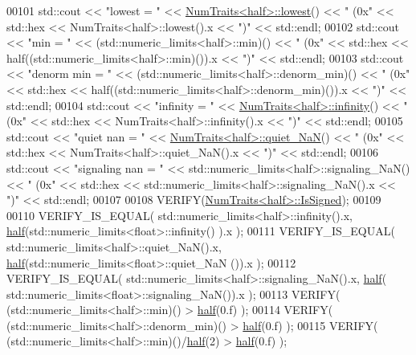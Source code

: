 \begin{DoxyCode}
00101   std::cout << \textcolor{stringliteral}{"lowest        = "} << \hyperlink{group___core___module_struct_eigen_1_1_num_traits}{NumTraits<half>::lowest}() << \textcolor{stringliteral}{"  (0x"} << 
      std::hex << NumTraits<half>::lowest().x << \textcolor{stringliteral}{")"} << std::endl;
00102   std::cout << \textcolor{stringliteral}{"min           = "} << (std::numeric\_limits<half>::min)() << \textcolor{stringliteral}{"  (0x"} << std::hex <<
       half((std::numeric\_limits<half>::min)()).x << \textcolor{stringliteral}{")"} << std::endl;
00103   std::cout << \textcolor{stringliteral}{"denorm min    = "} << (std::numeric\_limits<half>::denorm\_min)() << \textcolor{stringliteral}{"  (0x"} << std::hex <<
       half((std::numeric\_limits<half>::denorm\_min)()).x << \textcolor{stringliteral}{")"} << std::endl;
00104   std::cout << \textcolor{stringliteral}{"infinity      = "} << \hyperlink{group___core___module_struct_eigen_1_1_num_traits}{NumTraits<half>::infinity}() << \textcolor{stringliteral}{"  (0x"} << 
      std::hex << NumTraits<half>::infinity().x << \textcolor{stringliteral}{")"} << std::endl;
00105   std::cout << \textcolor{stringliteral}{"quiet nan     = "} << \hyperlink{group___core___module_struct_eigen_1_1_num_traits}{NumTraits<half>::quiet\_NaN}() << \textcolor{stringliteral}{"  (0x"} << 
      std::hex << NumTraits<half>::quiet\_NaN().x << \textcolor{stringliteral}{")"} << std::endl;
00106   std::cout << \textcolor{stringliteral}{"signaling nan = "} << std::numeric\_limits<half>::signaling\_NaN() << \textcolor{stringliteral}{"  (0x"} << std::hex <<
       std::numeric\_limits<half>::signaling\_NaN().x << \textcolor{stringliteral}{")"} << std::endl;
00107 
00108   VERIFY(\hyperlink{group___core___module_struct_eigen_1_1_num_traits}{NumTraits<half>::IsSigned});
00109 
00110   VERIFY\_IS\_EQUAL( std::numeric\_limits<half>::infinity().x, \hyperlink{struct_eigen_1_1half}{half}(std::numeric\_limits<float>::infinity()
      ).x );
00111   VERIFY\_IS\_EQUAL( std::numeric\_limits<half>::quiet\_NaN().x, \hyperlink{struct_eigen_1_1half}{half}(std::numeric\_limits<float>::quiet\_NaN
      ()).x );
00112   VERIFY\_IS\_EQUAL( std::numeric\_limits<half>::signaling\_NaN().x, \hyperlink{struct_eigen_1_1half}{half}(
      std::numeric\_limits<float>::signaling\_NaN()).x );
00113   VERIFY( (std::numeric\_limits<half>::min)() > \hyperlink{struct_eigen_1_1half}{half}(0.f) );
00114   VERIFY( (std::numeric\_limits<half>::denorm\_min)() > \hyperlink{struct_eigen_1_1half}{half}(0.f) );
00115   VERIFY( (std::numeric\_limits<half>::min)()/\hyperlink{struct_eigen_1_1half}{half}(2) > \hyperlink{struct_eigen_1_1half}{half}(0.f) );

\end{DoxyCode}
